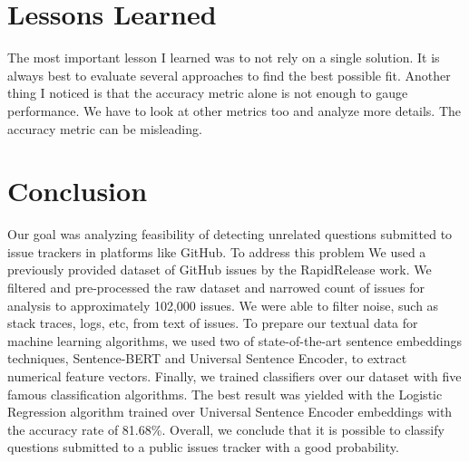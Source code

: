 \documentclass[conference]{IEEEtran}
\begin{document}
\section{Lessons Learned}
The most important lesson I learned was to not rely on a single solution. It is always best to evaluate several 
approaches to find the best possible fit. Another thing I noticed is that the accuracy metric alone is not enough 
to gauge performance. We have to look at other metrics too and analyze more details. The accuracy metric can be 
misleading.

\section{Conclusion}\label{conclusion}
Our goal was analyzing feasibility of detecting unrelated questions submitted to issue trackers in platforms like 
GitHub. To address this problem We used a previously provided dataset of GitHub issues by the RapidRelease work. 
We filtered and pre-processed the raw dataset and narrowed count of issues for analysis to approximately 
102,000 issues. We were able to filter noise, such as stack traces, logs, etc, from text of issues. 
To prepare our textual data for machine learning algorithms, we used two of state-of-the-art sentence embeddings
techniques, Sentence-BERT and Universal Sentence Encoder, to extract numerical feature vectors. Finally, we 
trained classifiers over our dataset with five famous classification algorithms. The best result was yielded
with the Logistic Regression algorithm trained over Universal Sentence Encoder embeddings with the accuracy
rate of 81.68\%. Overall, we conclude that it is possible to classify questions submitted to a public issues tracker
with a good probability. 



\vspace{12pt}
\color{red}
\end{document}
